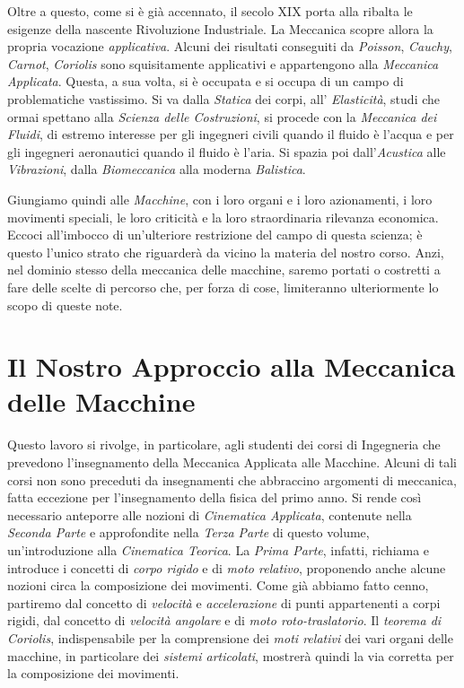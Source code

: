 \noindent Oltre a questo, come si \`e gi\`a accennato, il secolo XIX porta alla
ribalta le esigenze della nascente Rivoluzione Industriale. La Meccanica scopre
allora la propria vocazione {\em applicativa}. Alcuni dei risultati conseguiti da
{\em Poisson}, {\em Cauchy}, {\em Carnot}, {\em Coriolis} sono squisitamente
applicativi e appartengono alla {\em Meccanica Applicata}. 
Questa, a sua volta, si \`e occupata e si occupa di un 
campo di problematiche vastissimo. Si va dalla {\em Statica} dei corpi, all'{\em
Elasticit\`a}, studi che ormai spettano alla {\em Scienza delle Costruzioni},
si procede con la {\em Meccanica dei Fluidi}, di estremo interesse
per gli ingegneri civili quando il fluido \`e l'acqua e per gli ingegneri aeronautici quando
il fluido \`e l'aria. Si spazia poi dall'{\em Acustica} alle {\em Vibrazioni}, dalla
{\em Biomeccanica} alla moderna {\em Balistica}.

\noindent Giungiamo  quindi alle {\em Macchine}, con i loro organi e i loro azionamenti, 
i loro movimenti speciali, le loro 
criticit\`a e la loro straordinaria rilevanza economica.
Eccoci all'imbocco di un'ulteriore restrizione del campo di questa
scienza; \`e questo l'unico strato che riguarder\`a da vicino la materia del
nostro corso. 
Anzi, nel dominio stesso della meccanica delle macchine, saremo portati o costretti
a fare delle scelte di percorso che, per forza di cose, limiteranno ulteriormente 
lo scopo di queste note.

\section{Il Nostro Approccio alla Meccanica delle  Macchine}
Questo lavoro si rivolge, in particolare, agli studenti dei corsi di
Ingegneria che prevedono l'insegnamento della Meccanica Applicata alle Macchine.
Alcuni di tali corsi non sono preceduti
da insegnamenti che abbraccino argomenti di meccanica,
fatta eccezione per l'insegnamento
della fisica del primo anno. Si rende cos\`i necessario anteporre alle
nozioni di {\em Cinematica Applicata}, contenute nella {\em Seconda Parte} e
approfondite nella {\em Terza Parte}
di questo volume, un'introduzione alla {\em Cinematica Teorica}.
La {\em Prima Parte}, infatti, richiama
e introduce i concetti di {\em corpo rigido} e di {\em moto relativo},
proponendo anche alcune nozioni circa la composizione
dei movimenti. Come gi\`a abbiamo fatto cenno, partiremo dal concetto di 
{\em velocit\`a}  e {\em accelerazione} di punti appartenenti a corpi rigidi,
dal concetto di {\em velocit\`a angolare} e di {\em moto roto-traslatorio}. 
Il {\em teorema di Coriolis}, indispensabile per la comprensione
dei {\em moti relativi} dei vari organi
delle macchine, in particolare dei {\em sistemi articolati},
mostrer\`a quindi la via corretta per la composizione dei movimenti. 


